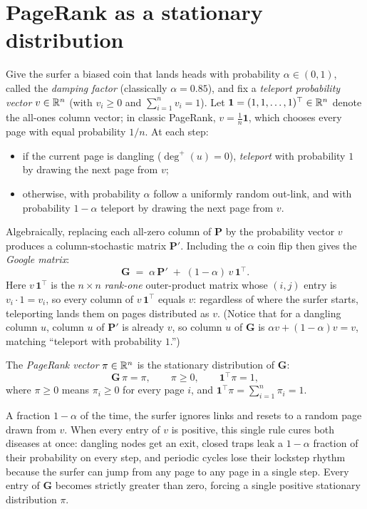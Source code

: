 \section{PageRank as a stationary distribution}
\label{ch36:stationary}

Give the surfer a biased coin that lands heads with probability $\alpha \in (0,1)$, called the \emph{damping factor} (classically $\alpha=0.85$), and fix a \emph{teleport probability vector} $v \in \mathbb{R}^n$ (with $v_i \ge 0$ and $\sum_{i=1}^n v_i = 1$). Let $\mathbf{1} = (1,1,\dots,1)^\top \in \mathbb{R}^n$ denote the all-ones column vector; in classic PageRank, $v = \tfrac{1}{n}\mathbf{1}$, which chooses every page with equal probability $1/n$. At each step:
\begin{itemize}
  \item if the current page is dangling ($\deg^+(u) = 0$), \emph{teleport} with probability $1$ by drawing the next page from $v$;
  \item otherwise, with probability $\alpha$ follow a uniformly random out-link, and with probability $1-\alpha$ teleport by drawing the next page from $v$.
\end{itemize}
Algebraically, replacing each all-zero column of $\mathbf{P}$ by the probability vector $v$ produces a column-stochastic matrix $\mathbf{P}'$. Including the $\alpha$ coin flip then gives the \emph{Google matrix}:
\[
  \boxed{\;\mathbf{G} \;=\; \alpha\, \mathbf{P}' \;+\; (1-\alpha)\, v\,\mathbf{1}^\top.\;}
\]
Here $v\,\mathbf{1}^\top$ is the $n \times n$ \emph{rank-one} outer-product matrix whose $(i,j)$ entry is $v_i \cdot 1 = v_i$, so every column of $v\,\mathbf{1}^\top$ equals $v$: regardless of where the surfer starts, teleporting lands them on pages distributed as $v$. (Notice that for a dangling column $u$, column $u$ of $\mathbf{P}'$ is already $v$, so column $u$ of $\mathbf{G}$ is $\alpha v + (1-\alpha)v = v$, matching ``teleport with probability $1$.'')

The \emph{PageRank vector} $\pi \in \mathbb{R}^n$ is the stationary distribution of $\mathbf{G}$:
\[
  \boxed{\;\mathbf{G}\,\pi = \pi, \qquad \pi \ge 0, \qquad \mathbf{1}^\top \pi = 1,\;}
\]
where $\pi \ge 0$ means $\pi_i \ge 0$ for every page $i$, and $\mathbf{1}^\top \pi = \sum_{i=1}^n \pi_i = 1$.

\begin{intuitionbox}
A fraction $1-\alpha$ of the time, the surfer ignores links and resets to a random page drawn from $v$. When every entry of $v$ is positive, this single rule cures both diseases at once: dangling nodes get an exit, closed traps leak a $1-\alpha$ fraction of their probability on every step, and periodic cycles lose their lockstep rhythm because the surfer can jump from any page to any page in a single step. Every entry of $\mathbf{G}$ becomes strictly greater than zero, forcing a single positive stationary distribution $\pi$.
\end{intuitionbox}

